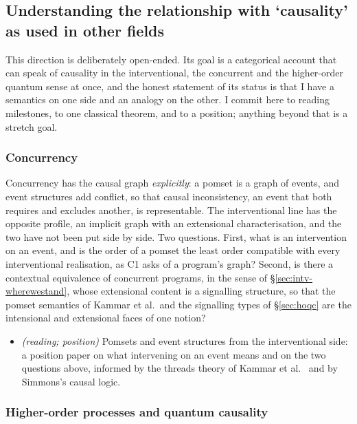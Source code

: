\subsection{Understanding the relationship with `causality' as used in other fields}\label{sec:prop-other}

This direction is deliberately open-ended. Its goal is a categorical account that can speak of causality in the interventional, the concurrent and the higher-order quantum sense at once, and the honest statement of its status is that I have a semantics on one side and an analogy on the other. I commit here to reading milestones, to one classical theorem, and to a position; anything beyond that is a stretch goal.

\subsubsection{Concurrency}\label{sec:prop-concurrency}

Concurrency has the causal graph \emph{explicitly}: a pomset is a graph of events, and event structures add conflict, so that causal inconsistency, an event that both requires and excludes another, is representable. The interventional line has the opposite profile, an implicit graph with an extensional characterisation, and the two have not been put side by side. Two questions. First, what is an intervention on an event, and is the order of a pomset the least order compatible with every interventional realisation, as C1 asks of a program's graph? Second, is there a contextual equivalence of concurrent programs, in the sense of \S\ref{sec:intv-wherewestand}, whose extensional content is a signalling structure, so that the pomset semantics of Kammar et al.\ and the signalling types of \S\ref{sec:hoqc} are the intensional and extensional faces of one notion?
\begin{itemize}[nosep]
\item[D1] \textit{(reading; position)} Pomsets and event structures from the interventional side: a position paper on what intervening on an event means and on the two questions above, informed by the threads theory of Kammar et al.\ \cite{kammar2026threads} and by Simmons's causal logic.
\end{itemize}

\subsubsection{Higher-order processes and quantum causality}\label{sec:prop-hoqc}

